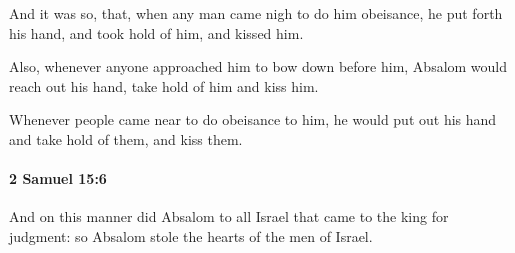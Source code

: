 			\begin{versebox}
					\item[BHS] 
					\item[ASV] And it was so, that, when any man came nigh to do him obeisance, he put forth his hand, and took hold of him, and kissed him.
					\item[NIV] Also, whenever anyone approached him to bow down before him, Absalom would reach out his hand, take hold of him and kiss him.
					\item[NRSV] Whenever people came near to do obeisance to him, he would put out his hand and take hold of them, and kiss them.
			\end{versebox}

		\paragraph{2 Samuel 15:6} %
			\label{2SAMUEL-15-6}

			And on this manner did Absalom to all Israel that came to the king for judgment: so Absalom stole the hearts of the men of Israel.

